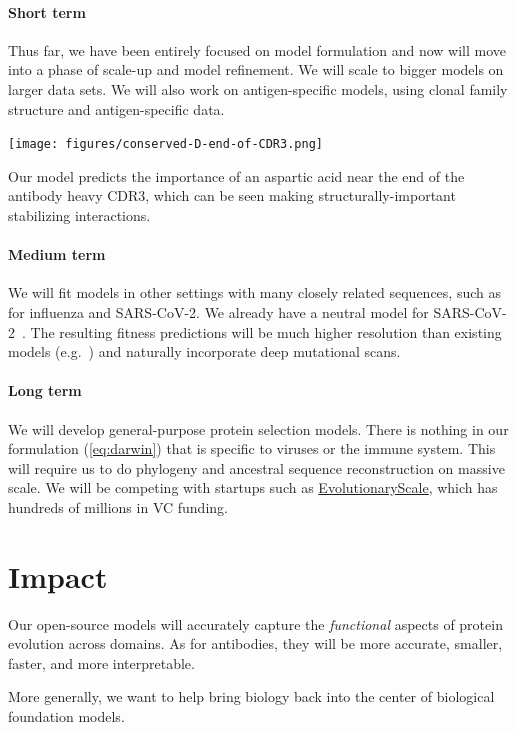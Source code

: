 \documentclass[nobib]{tufte-handout}
\begin{document}
\paragraph{Short term}
Thus far, we have been entirely focused on model formulation and now will move into a phase of scale-up and model refinement. We will scale to bigger models on larger data sets. We will also work on antigen-specific models, using clonal family structure and antigen-specific data.

\begin{marginfigure}[1.3cm]%
  \hspace{-7pt}
  \texttt{[image: figures/conserved-D-end-of-CDR3.png]}
  \caption{Our model predicts the importance of an aspartic acid near the end of the antibody heavy CDR3, which can be seen making structurally-important stabilizing interactions.}
  \label{fig:interpretation}
\end{marginfigure}

\paragraph{Medium term}
We will fit models in other settings with many closely related sequences, such as for influenza and SARS-CoV-2.
We already have a neutral model for SARS-CoV-2~\cite{Haddox2025-ej}.
The resulting fitness predictions will be much higher resolution than existing models (e.g.~\cite{Bloom2023-af}) and naturally incorporate deep mutational scans.

\paragraph{Long term}
We will develop general-purpose protein selection models.
There is nothing in our formulation (\ref{eq:darwin}) that is specific to viruses or the immune system.
This will require us to do phylogeny and ancestral sequence reconstruction on massive scale.
We will be competing with startups such as \href{https://www.evolutionaryscale.ai/}{EvolutionaryScale}, which has hundreds of millions in VC funding.

\section{Impact}
Our open-source models will accurately capture the \emph{functional} aspects of protein evolution across domains. 
As for antibodies, they will be more accurate, smaller, faster, and more interpretable.

More generally, we want to help bring biology back into the center of biological foundation models.




\newpage


\end{document}
